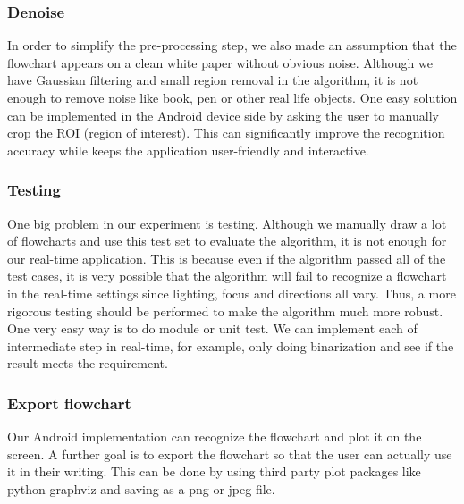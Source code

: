 \documentclass[conference,twocolumn]{IEEEtran}
\begin{document}
\subsubsection{Denoise}
In order to simplify the pre-processing step, we also made an assumption that the flowchart appears on a clean white paper without obvious noise. Although we have Gaussian filtering and small region removal in the algorithm, it is not enough to remove noise like book, pen or other real life objects. One easy solution can be implemented in the Android device side by asking the user to manually crop the ROI (region of interest). This can significantly improve the recognition accuracy while keeps the application user-friendly and interactive.  
\subsubsection{Testing}
One big problem in our experiment is testing. Although we manually draw a lot of flowcharts and use this test set to evaluate the algorithm, it is not enough for our real-time application. This is because even if the algorithm passed all of the test cases, it is very possible that the algorithm will fail to recognize a flowchart in the real-time settings since lighting, focus and directions all vary. Thus, a more rigorous testing should be performed to make the algorithm much more robust. One very easy way is to do module or unit test. We can implement each of intermediate step in real-time, for example, only doing binarization and see if the result meets the requirement.
\subsubsection{Export flowchart}
Our Android implementation can recognize the flowchart and plot it on the screen. A further goal is to export the flowchart so that the user can actually use it in their writing. This can be done by using third party plot packages like python graphviz and saving as a png or jpeg file.


\ifCLASSOPTIONcaptionsoff
  \newpage
\fi



\end{document}
